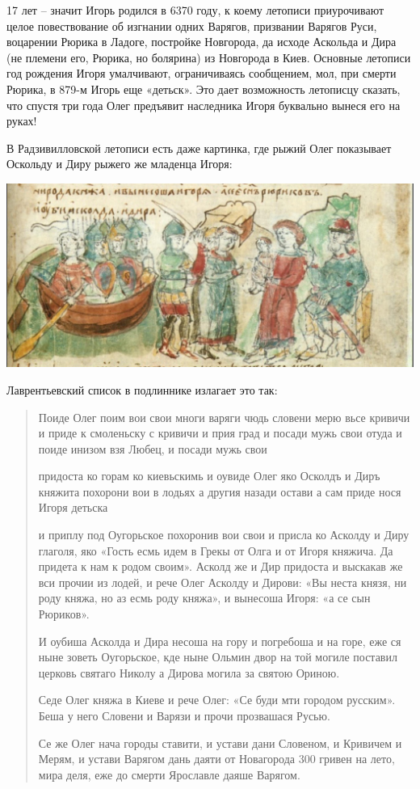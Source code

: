 17 лет – значит Игорь родился в 6370 году, к коему летописи приурочивают целое повествование об изгнании одних Варягов, призвании Варягов Руси, воцарении Рюрика в Ладоге, постройке Новгорода, да исходе Аскольда и Дира (не племени его, Рюрика, но болярина) из Новгорода в Киев. Основные летописи год рождения Игоря умалчивают, ограничиваясь сообщением, мол, при смерти Рюрика, в 879-м Игорь еще «детьск». Это дает возможность летописцу сказать, что спустя три года Олег предъявит наследника Игоря буквально вынеся его на руках!

В Радзивилловской летописи есть даже картинка, где рыжий Олег показывает Оскольду и Диру рыжего же младенца Игоря:

\begin{center}
\includegraphics[width=\linewidth]{chast-volga/oskoldidir/radz-oskold.jpg}
\end{center}

Лаврентьевский список в подлиннике излагает это так:

\begin{quotation}
Поиде Олег поим вои свои многи варяги чюдь словени мерю вьсе кривичи и приде к смоленьску с кривичи и прия град и посади мужь свои отуда и поиде инизом взя Любец, и посади мужь свои 

придоста ко горам ко киевьскимь и оувиде Олег яко Осколдъ и Диръ княжита похорони вои в лодьях а другия назади остави а сам приде нося Игоря детьска

и приплу под Оугорьское похоронив вои свои и присла ко Асколду и Диру глаголя, яко «Гость есмь идем в Грекы от Олга и от Игоря княжича. Да придета к нам к родом своим». Асколд же и Дир придоста и выскакав же вси прочии из лодей, и рече Олег Асколду и Дирови: «Вы неста князя, ни роду княжа, но аз есмь роду княжа», и вынесоша Игоря: «а се сын Рюриков». 

И оубиша Асколда и Дира несоша на гору и погребоша и на горе, еже ся ныне зоветь Оугорьское, кде ныне Ольмин двор на той могиле поставил церковь святаго Николу а Дирова могила за святою Ориною. 

Седе Олег княжа в Киеве и рече Олег: «Се буди мти городом русским». Беша у него Словени и Варязи и прочи прозвашася Русью.

Се же Олег нача городы ставити, и устави дани Словеном, и Кривичем и Мерям, и устави Варягом дань даяти от Новагорода 300 гривен на лето, мира деля, еже до смерти Ярославле даяше Варягом.
\end{quotation}


